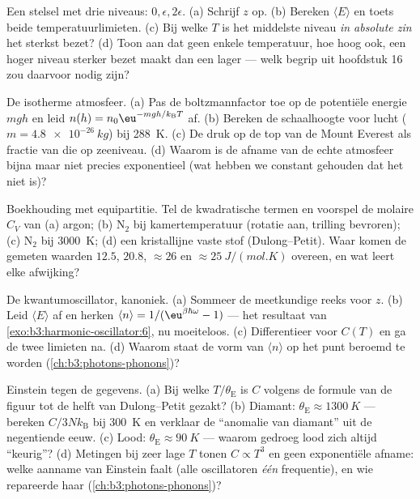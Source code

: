 \begin{exercise}[$\star$]\label{exo:b3:canonical-ensemble:2}
Een stelsel met drie niveaus: $0, \epsilon, 2\epsilon$. (a) Schrijf $z$
op. (b) Bereken $\langle E\rangle$ en toets beide temperatuurlimieten. (c)
Bij welke $T$ is het middelste niveau \emph{in absolute zin} het sterkst
bezet? (d) Toon aan dat geen enkele temperatuur, hoe hoog ook, een hoger
niveau sterker bezet maakt dan een lager --- welk begrip uit hoofdstuk 16
zou daarvoor nodig zijn?
\end{exercise}

\begin{exercise}[$\star$]\label{exo:b3:canonical-ensemble:3}
De isotherme atmosfeer. (a) Pas de boltzmannfactor toe op de potentiële
energie $mgh$ en leid $n(h) = n_0\eu^{-mgh/k_{\text{B}}
T}$ af. (b) Bereken
de schaalhoogte voor lucht ($m = \qty{4.8e-26}{kg}$) bij \qty{288}{K}. (c)
De druk op de top van de Mount Everest als fractie van die op zeeniveau.
(d) Waarom is de afname van de echte atmosfeer bijna maar niet precies
exponentieel (wat hebben we constant gehouden dat het niet is)?
\end{exercise}

\begin{exercise}[$\star$]\label{exo:b3:canonical-ensemble:4}
Boekhouding met equipartitie. Tel de kwadratische termen en voorspel de
molaire $C_V$ van (a) argon; (b) N$_2$ bij kamertemperatuur (rotatie aan,
trilling bevroren); (c) N$_2$ bij \qty{3000}{K}; (d) een kristallijne
vaste stof (Dulong--Petit). Waar komen de gemeten waarden $12.5$, $20.8$,
$\approx26$ en $\approx\qty{25}{J/(mol.K)}$ overeen, en wat leert elke
afwijking?
\end{exercise}

\begin{exercise}[$\star\star$]\label{exo:b3:canonical-ensemble:5}
De kwantumoscillator, kanoniek. (a) Sommeer de meetkundige reeks voor $z$.
(b) Leid $\langle E\rangle$ af en herken $\langle
n\rangle = 1/(\eu^{\beta\hbar\omega} - 1)$ --- het resultaat van
\cref{exo:b3:harmonic-oscillator:6}, nu moeiteloos. (c) Differentieer voor
$C(T)$ en ga de twee limieten na. (d) Waarom staat de vorm van $\langle n\rangle$ op het punt beroemd te worden
(\cref{ch:b3:photons-phonons})?
\end{exercise}

\begin{exercise}[$\star\star$]\label{exo:b3:canonical-ensemble:6}
Einstein tegen de gegevens. (a) Bij welke $T/\theta_{\text{E}}$ is $C$
volgens de formule van de figuur tot de helft van Dulong--Petit gezakt?
(b) Diamant: $\theta_{\text{E}} \approx \qty{1300}{K}$ --- bereken
$C/3Nk_{\text{B}}$ bij \qty{300}{K} en verklaar de ``anomalie van diamant''
uit de negentiende eeuw. (c) Lood: $\theta_{\text{E}}
\approx \qty{90}{K}$
--- waarom gedroeg lood zich altijd ``keurig''? (d) Metingen bij zeer lage
$T$ tonen $C \propto T^3$ en geen exponentiële afname: welke aanname van
Einstein faalt (alle oscillatoren \emph{één} frequentie), en wie
repareerde haar (\cref{ch:b3:photons-phonons})?
\end{exercise}

